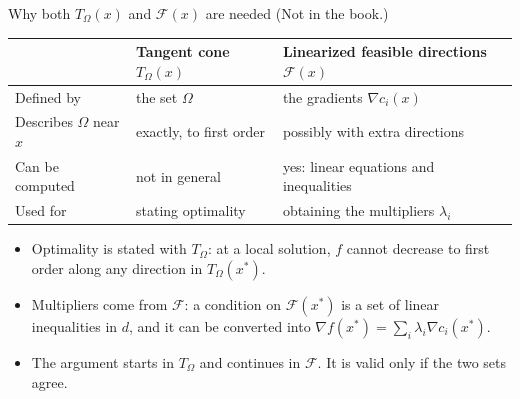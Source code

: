 \documentclass[aspectratio=169,12pt]{beamer}
\newcommand{\xs}{x^{*}}
\newcommand{\gradf}{\nabla f}
\newcommand{\cF}{\mathcal{F}}
\newcommand{\TO}{T_{\Omega}}
\begin{document}
\begin{frame}{Why both $\TO(x)$ and $\cF(x)$ are needed {\normalfont\small(Not in the book.)}}
  \begin{center}\small\setlength\tabcolsep{7pt}
  \renewcommand{\arraystretch}{1.15}
  \begin{tabular}{lll}
    \toprule
     & Tangent cone $\TO(x)$ & Linearized feasible directions $\cF(x)$ \\
    \midrule
    Defined by & the set $\Omega$ & the gradients $\nabla c_{i}(x)$ \\
    Describes $\Omega$ near $x$ & exactly, to first order & possibly with extra directions \\
    Can be computed & not in general & yes: linear equations and inequalities \\
    Used for & stating optimality & obtaining the multipliers $\lambda_{i}$ \\
    \bottomrule
  \end{tabular}
  \end{center}
  \begin{itemize}\setlength\itemsep{0.3em}
    \item Optimality is stated with $\TO$: at a local solution, $f$ cannot decrease to first order
      along any direction in $\TO(\xs)$.
    \item Multipliers come from $\cF$: a condition on $\cF(\xs)$ is a set of linear inequalities in $d$,
      and it can be converted into $\gradf(\xs)=\sum_{i}\lambda_{i}\nabla c_{i}(\xs)$.
    \item The argument starts in $\TO$ and continues in $\cF$. It is valid only if the two sets agree.
  \end{itemize}
\end{frame}
\end{document}
